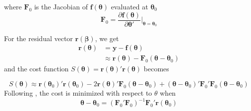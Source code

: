 where $\mathbf{F}_0$ is the Jacobian of $\mathbf{f}(\boldsymbol{\theta})$ 
evaluated at $\boldsymbol{\theta}_0$
\begin{equation}
\mathbf{F}_0 = \frac{\partial \mathbf{f}(\boldsymbol{\theta})} {\partial \boldsymbol{\theta}'} \bigg|_{\boldsymbol{\theta} = \boldsymbol{\theta}_0}
\end{equation}


For the residual vector $\mathbf{r}(\boldsymbol{\beta})$, we get
\begin{align}
\mathbf{r}(\boldsymbol{\theta}) 
&= \mathbf{y} - \mathbf{f}(\boldsymbol{\theta}) \nonumber\\
&\approx \mathbf{r}(\boldsymbol{\theta}) - \mathbf{F}_0(\boldsymbol{\theta} - \boldsymbol{\theta}_0)
\end{align}
and the cost function 
$S(\boldsymbol{\theta}) = \mathbf{r}(\boldsymbol{\theta})' \mathbf{r}(\boldsymbol{\theta})$
becomes

\begin{equation}
S(\boldsymbol{\theta}) \approx
\mathbf{r}(\boldsymbol{\theta}_0)' \mathbf{r}(\boldsymbol{\theta}_0) -
2 \mathbf{r}(\boldsymbol{\theta}) ' \mathbf{F}_0(\boldsymbol{\theta} - \boldsymbol{\theta}_0) + 
(\boldsymbol{\theta} - \boldsymbol{\theta}_0)'
\mathbf{F}_0' \mathbf{F}_0
(\boldsymbol{\theta} - \boldsymbol{\theta}_0)
\end{equation}
Following \citet[chap. 2]{Seber}, the cost is minimized with respect to $\theta$ when
\begin{equation}
\boldsymbol{\theta} - \boldsymbol{\theta}_0 = 
(\mathbf{F}_0' \mathbf{F}_0)^{-1} \mathbf{F}_0' \mathbf{r}(\boldsymbol{\theta}_0)
\end{equation}

